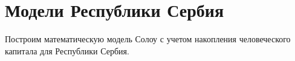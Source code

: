 \chapter{Модели Республики Сербия}
Построим математическую модель Солоу с учетом накопления человеческого капитала для Республики Сербия.
